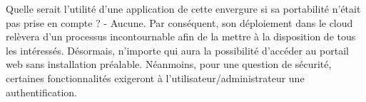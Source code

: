 \par
Quelle serait l'utilité d'une application de cette envergure 
si sa portabilité n'était pas prise en compte ? - Aucune. Par 
conséquent, son déploiement dans le cloud relèvera d'un processus incontournable 
afin de la mettre à la disposition de tous les intéressés. Désormais, 
n'importe qui aura la possibilité d'accéder au portail web sans 
installation préalable. Néanmoins, pour une question de sécurité, 
certaines fonctionnalités exigeront à l'utilisateur/administrateur une authentification.
